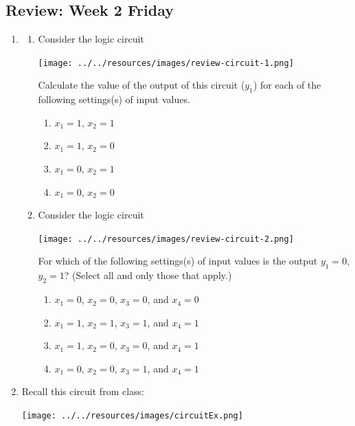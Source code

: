 \documentclass[12pt, oneside]{article}
\begin{document}
 \newpage
\subsection*{Review: Week 2 Friday}
\begin{enumerate}
    \item {

\begin{enumerate}
    \item Consider the logic circuit
        \begin{center}
        \texttt{[image: ../../resources/images/review-circuit-1.png]}
        \end{center}
        Calculate the value of the output of this circuit ($y_1$) for each of the following settings(s) of input values.
        \begin{enumerate}
            \item $x_1 = 1$, $x_2 = 1$
            \item $x_1 = 1$, $x_2 = 0$
            \item $x_1 = 0$, $x_2 = 1$
            \item $x_1 = 0$, $x_2 = 0$
        \end{enumerate}  \item Consider the logic circuit
        \begin{center}
        \texttt{[image: ../../resources/images/review-circuit-2.png]}
        \end{center}
        For which of the following settings(s) of input values is the output
        $y_1 = 0$, $y_2 = 1$? (Select all and only those that apply.)
        \begin{enumerate}
            \item $x_1 = 0$, $x_2 = 0$, $x_3 = 0$, and $x_4 = 0$
            \item $x_1 = 1$, $x_2 = 1$, $x_3 = 1$, and $x_4 = 1$
            \item $x_1 = 1$, $x_2 = 0$, $x_3 = 0$, and $x_4 = 1$
            \item $x_1 = 0$, $x_2 = 0$, $x_3 = 1$, and $x_4 = 1$
        \end{enumerate}
      
    \end{enumerate}
     }
    \item {

Recall this circuit from class:
\begin{center}
    \texttt{[image: ../../resources/images/circuitEx.png]} 
 \end{center}

}
\end{enumerate}
\end{document}
